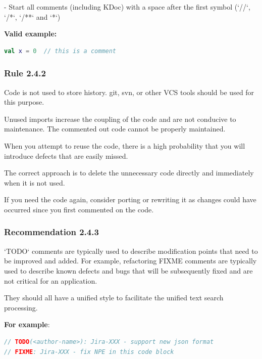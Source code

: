 - Start all comments (including KDoc) with a space after the first symbol (`//`, `/*`, `/**` and `*`)



\textbf{Valid example:}

\begin{lstlisting}[language=Kotlin]
val x = 0  // this is a comment
\end{lstlisting}


\subsubsection*{\textbf{Rule 2.4.2}}
\leavevmode\newline



Code is not used to store history. git, svn, or other VCS tools should be used for this purpose.

Unused imports increase the coupling of the code and are not conducive to maintenance. The commented out code cannot be properly maintained.

When you attempt to reuse the code, there is a high probability that you will introduce defects that are easily missed.

The correct approach is to delete the unnecessary code directly and immediately when it is not used.

If you need the code again, consider porting or rewriting it as changes could have occurred since you first commented on the code.



\subsubsection*{\textbf{Recommendation 2.4.3}}
\leavevmode\newline



`TODO` comments are typically used to describe modification points that need to be improved and added. For example, refactoring FIXME comments are typically used to describe known defects and bugs that will be subsequently fixed and are not critical for an application.

They should all have a unified style to facilitate the unified text search processing.



\textbf{For example}:

\begin{lstlisting}[language=Kotlin]
// TODO(<author-name>): Jira-XXX - support new json format
// FIXME: Jira-XXX - fix NPE in this code block
\end{lstlisting}


